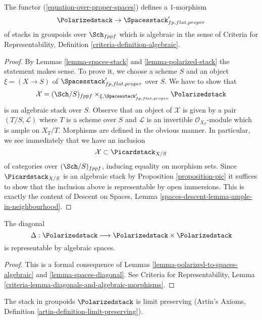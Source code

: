 \begin{lemma}
\label{lemma-polarized-to-spaces-algebraic}
The functor (\ref{equation-over-proper-spaces}) defines a $1$-morphism
$$
\Polarizedstack \to \Spacesstack'_{fp, flat, proper}
$$
of stacks in groupoids over $\Sch_{fppf}$
which is algebraic in the sense of
Criteria for Representability, Definition
\ref{criteria-definition-algebraic}.
\end{lemma}

\begin{proof}
By Lemmas \ref{lemma-spaces-stack} and \ref{lemma-polarized-stack}
the statement makes sense. To prove it, we choose a scheme $S$
and an object $\xi = (X \to S)$ of $\Spacesstack'_{fp, flat, proper}$
over $S$. We have to show that
$$
\mathcal{X} = (\Sch/S)_{fppf} \times_{\xi, \Spacesstack'_{fp, flat, proper}}
\Polarizedstack
$$
is an algebraic stack over $S$. Observe that an object of $\mathcal{X}$
is given by a pair $(T/S, \mathcal{L})$ where $T$ is a scheme
over $S$ and $\mathcal{L}$ is an invertible $\mathcal{O}_{X_T}$-module
which is ample on $X_T/T$. Morphisms are defined in the obvious manner.
In particular, we see immediately that we have an inclusion
$$
\mathcal{X} \subset \Picardstack_{X/S}
$$
of categories over $(\Sch/S)_{fppf}$, inducing equality on morphism
sets. Since $\Picardstack_{X/S}$ is an algebraic stack by
Proposition \ref{proposition-pic} it suffices to show that the inclusion
above is representable by open immersions. This is exactly the content
of Descent on Spaces, Lemma
\ref{spaces-descent-lemma-ample-in-neighbourhood}.
\end{proof}

\begin{lemma}
\label{lemma-polarized-diagonal}
The diagonal
$$
\Delta : \Polarizedstack \longrightarrow
\Polarizedstack \times \Polarizedstack
$$
is representable by algebraic spaces.
\end{lemma}

\begin{proof}
This is a formal consequence of
Lemmas \ref{lemma-polarized-to-spaces-algebraic} and
\ref{lemma-spaces-diagonal}.
See Criteria for Representability, Lemma
\ref{criteria-lemma-diagonals-and-algebraic-morphisms}.
\end{proof}

\begin{lemma}
\label{lemma-polarized-limits}
The stack in groupoids $\Polarizedstack$ is limit preserving
(Artin's Axioms, Definition \ref{artin-definition-limit-preserving}).
\end{lemma}

